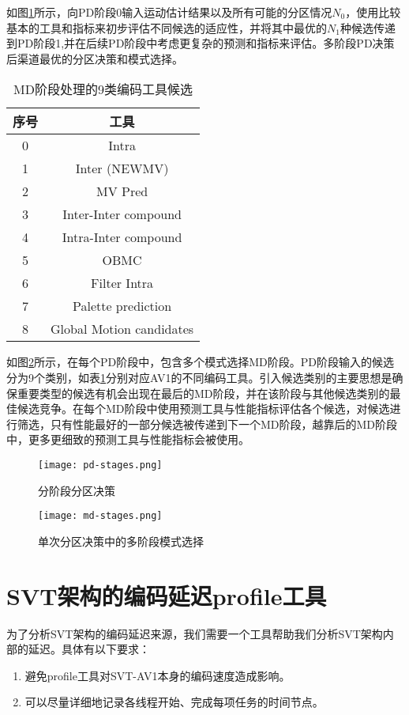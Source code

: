  如图\ref{fig:pd}所示，向PD阶段0输入运动估计结果以及所有可能的分区情况$N_0$，使用比较基本的工具和指标来初步评估不同候选的适应性，并将其中最优的$N_1$种候选传递到PD阶段1,并在后续PD阶段中考虑更复杂的预测和指标来评估。多阶段PD决策后渠道最优的分区决策和模式选择。

  \begin{table}[!hpt]
    \renewcommand{\arraystretch}{0.8}
    \caption{MD阶段处理的9类编码工具候选}
    \label{tab:av1-classes}
    \centering
    \begin{tabular}{cc} \toprule
      序号    & 工具 \\ \midrule
      0& Intra \\
      1& Inter (NEWMV) \\
      2& MV Pred  \\
      3& Inter-Inter compound \\
      4& Intra-Inter compound \\
      5& OBMC \\
      6& Filter Intra \\
      7& Palette prediction \\
      8& Global Motion candidates \\\bottomrule
    \end{tabular}
  \end{table}

  如图\ref{fig:md}所示，在每个PD阶段中，包含多个模式选择MD阶段。PD阶段输入的候选分为9个类别，如表\ref{tab:av1-classes}分别对应AV1的不同编码工具。引入候选类别的主要思想是确保重要类型的候选有机会出现在最后的MD阶段，并在该阶段与其他候选类别的最佳候选竞争。在每个MD阶段中使用预测工具与性能指标评估各个候选，对候选进行筛选，只有性能最好的一部分候选被传递到下一个MD阶段，越靠后的MD阶段中，更多更细致的预测工具与性能指标会被使用。



  \begin{figure}[!htp]
    \centering
    \texttt{[image: pd-stages.png]}
    \caption{分阶段分区决策}
  \label{fig:pd}
  \end{figure}

  \begin{figure}[!htp]
    \centering
    \texttt{[image: md-stages.png]}
    \caption{单次分区决策中的多阶段模式选择}
  \label{fig:md}
  \end{figure}
\section{SVT架构的编码延迟profile工具} \label{sec:svt-profile}
  为了分析SVT架构的编码延迟来源，我们需要一个工具帮助我们分析SVT架构内部的延迟。具体有以下要求：
  \begin{enumerate} [label=\arabic*)]
    \item 避免profile工具对SVT-AV1本身的编码速度造成影响。
    \item 可以尽量详细地记录各线程开始、完成每项任务的时间节点。
  \end{enumerate}

